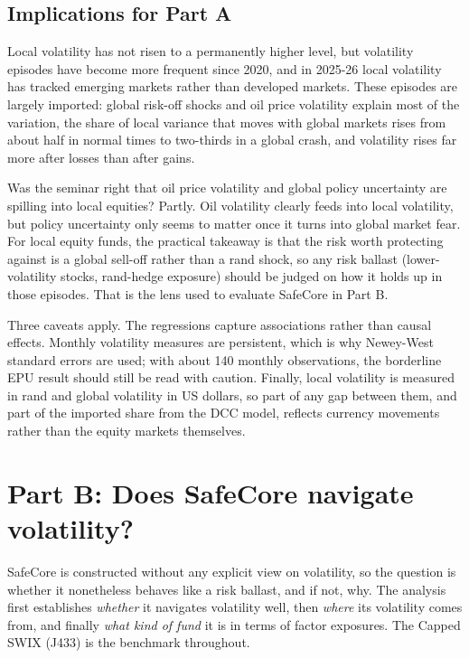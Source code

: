 \documentclass[11pt,preprint]{elsarticle}
\numberwithin{equation}{section}
\numberwithin{figure}{section}
\numberwithin{table}{section}
\begin{document}
\subsection{Implications for Part A}\label{implications-for-part-a}

Local volatility has not risen to a permanently higher level, but
volatility episodes have become more frequent since 2020, and in 2025-26
local volatility has tracked emerging markets rather than developed
markets. These episodes are largely imported: global risk-off shocks and
oil price volatility explain most of the variation, the share of local
variance that moves with global markets rises from about half in normal
times to two-thirds in a global crash, and volatility rises far more
after losses than after gains.

Was the seminar right that oil price volatility and global policy
uncertainty are spilling into local equities? Partly. Oil volatility
clearly feeds into local volatility, but policy uncertainty only seems
to matter once it turns into global market fear. For local equity funds,
the practical takeaway is that the risk worth protecting against is a
global sell-off rather than a rand shock, so any risk ballast
(lower-volatility stocks, rand-hedge exposure) should be judged on how
it holds up in those episodes. That is the lens used to evaluate
SafeCore in Part B.

Three caveats apply. The regressions capture associations rather than
causal effects. Monthly volatility measures are persistent, which is why
Newey-West standard errors are used; with about 140 monthly
observations, the borderline EPU result should still be read with
caution. Finally, local volatility is measured in rand and global
volatility in US dollars, so part of any gap between them, and part of
the imported share from the DCC model, reflects currency movements
rather than the equity markets themselves.

\section{\texorpdfstring{Part B: Does SafeCore navigate volatility?
\label{PartB}}{Part B: Does SafeCore navigate volatility? }}\label{part-b-does-safecore-navigate-volatility}

SafeCore is constructed without any explicit view on volatility, so the
question is whether it nonetheless behaves like a risk ballast, and if
not, why. The analysis first establishes \emph{whether} it navigates
volatility well, then \emph{where} its volatility comes from, and
finally \emph{what kind of fund} it is in terms of factor exposures. The
Capped SWIX (J433) is the benchmark throughout.
\end{document}
